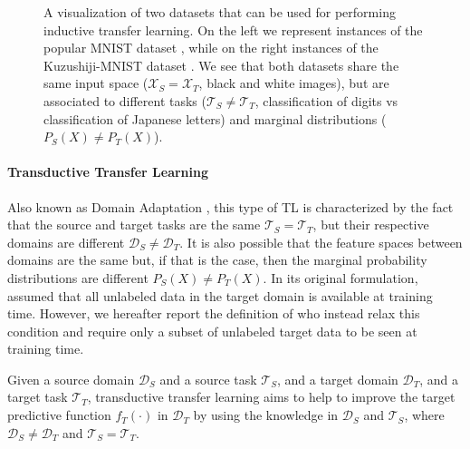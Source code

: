 \begin{figure}
  \endminipage\hfill
  \caption{A visualization of two datasets that can be used for performing inductive transfer learning. On the left we represent instances of the popular MNIST dataset \cite{lecun1994mnist}, while on the right instances of the Kuzushiji-MNIST dataset \cite{clanuwat2018deep}. We see that both datasets share the same input space ($\mathcal{X}_S = \mathcal{X}_T$, black and white images), but are associated to different tasks ($\mathcal{T}_S \neq \mathcal{T}_T$, classification of digits vs classification of Japanese letters) and marginal distributions ($P_S(X)\neq P_T(X)$).}
  \label{fig:inductive_tl}
\end{figure}


\paragraph{\textbf{\uppercase{T}ransductive \uppercase{T}ransfer \uppercase{L}earning}}
Also known as Domain Adaptation \cite{arnold2007comparative}, this type of TL is characterized by the fact that the source and target tasks are the same $\mathcal{T}_S = \mathcal{T}_T$, but their respective domains are different $\mathcal{D}_S \neq \mathcal{D}_T$. It is also possible that the feature spaces between domains are the same but, if that is the case, then the marginal probability distributions are different $P_S(X)\neq P_T(X)$. In its original formulation, \citet{arnold2007comparative} assumed that all unlabeled data in the target domain is available at training time. However, we hereafter report the definition of \citet{pan2009survey} who instead relax this condition and require only a subset of unlabeled target data to be seen at training time.
\begin{definition}
	Given a source domain $\mathcal{D}_S$ and a source task $\mathcal{T}_S$, and a target domain $\mathcal{D}_T$, and a target task $\mathcal{T}_T$, transductive transfer learning aims to help to improve the target predictive function $f_T(\cdot)$ in $\mathcal{D}_T$ by using the knowledge in $\mathcal{D}_S$ and $\mathcal{T}_S$, where $\mathcal{D}_S \neq \mathcal{D}_T$ and $\mathcal{T}_S = \mathcal{T}_T$. 
\end{definition}
